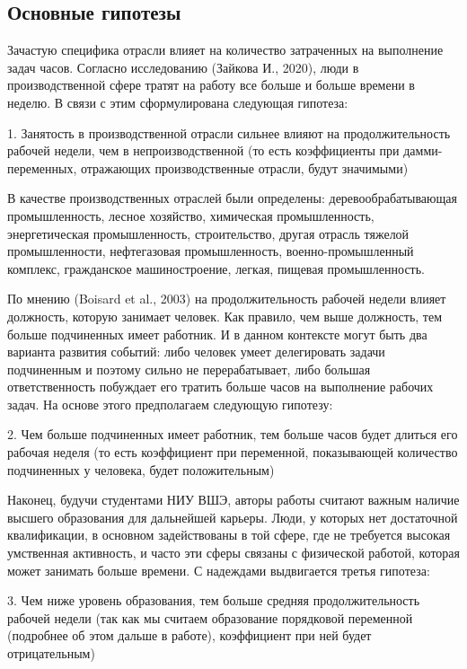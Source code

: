 \documentclass[12pt, a4paper]{article}
\begin{document}
{		\subsection{Основные гипотезы}
		
		Зачастую специфика отрасли влияет на количество затраченных на выполнение задач часов. Согласно исследованию (Зайкова И., 2020), люди в производственной сфере тратят на работу все больше и больше времени в неделю. В связи с этим сформулирована следующая гипотеза:
		
		1.  Занятость в производственной отрасли сильнее влияют на продолжительность рабочей недели, чем в непроизводственной (то есть коэффициенты при дамми-переменных, отражающих производственные отрасли, будут значимыми)
		
		В качестве производственных отраслей были определены: деревообрабатывающая промышленность, лесное хозяйство, химическая промышленность, энергетическая промышленность, строительство, другая отрасль тяжелой промышленности, нефтегазовая промышленность, военно-промышленный комплекс, гражданское машиностроение, легкая, пищевая промышленность.
		
		По мнению (Boisard et al., 2003) на продолжительность рабочей недели влияет должность, которую занимает человек. Как правило, чем выше должность, тем больше подчиненных имеет работник. И в данном контексте могут быть два варианта развития событий: либо человек умеет делегировать задачи подчиненным и поэтому сильно не перерабатывает, либо большая ответственность побуждает его тратить больше часов на выполнение рабочих задач. На основе этого предполагаем следующую гипотезу:
		
		2.  Чем больше подчиненных имеет работник, тем больше часов будет длиться его рабочая неделя (то есть коэффициент при переменной, показывающей количество подчиненных у человека, будет положительным)
		
		Наконец, будучи студентами НИУ ВШЭ, авторы работы считают важным наличие высшего образования для дальнейшей карьеры. Люди, у которых нет достаточной квалификации, в основном задействованы в той сфере, где не требуется высокая умственная активность, и часто эти сферы связаны с физической работой, которая может занимать больше времени. С надеждами выдвигается третья гипотеза:
		
		3.  Чем ниже уровень образования, тем больше средняя продолжительность рабочей недели (так как мы считаем образование порядковой переменной (подробнее об этом дальше в работе), коэффициент при ней будет отрицательным)
		
}
\end{document}
